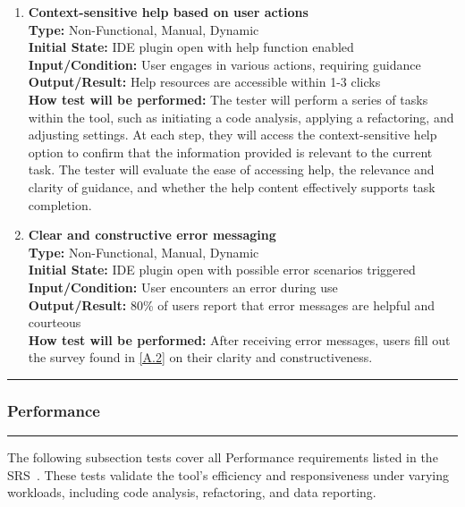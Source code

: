 \documentclass[12pt, titlepage]{article}
\newcommand{\colorrule}{\textcolor{BlueViolet}{\rule{\linewidth}{2pt}}}
\begin{document}
\begin{enumerate}[label={\bf \textcolor{Maroon}{test-UH-\arabic*}}, wide=0pt, font=\itshape]
  \item \textbf{Context-sensitive help based on user actions} \\[2mm]
    \textbf{Type:} Non-Functional, Manual, Dynamic \\
    \textbf{Initial State:} IDE plugin open with help function enabled \\
    \textbf{Input/Condition:} User engages in various actions, requiring guidance \\
    \textbf{Output/Result:} Help resources are accessible within 1-3 clicks \\[2mm]
    \textbf{How test will be performed:} The tester will perform a series of tasks within the tool, such as initiating a code analysis, applying a refactoring, and adjusting settings. At each step, they will access the context-sensitive help option to confirm that the information provided is relevant to the current task. The tester will evaluate the ease of accessing help, the relevance and clarity of guidance, and whether the help content effectively supports task completion.

  \item \textbf{Clear and constructive error messaging} \\[2mm]
    \textbf{Type:} Non-Functional, Manual, Dynamic \\
    \textbf{Initial State:} IDE plugin open with possible error scenarios triggered \\
    \textbf{Input/Condition:} User encounters an error during use \\
    \textbf{Output/Result:} 80\% of users report that error messages are helpful and courteous \\[2mm]
    \textbf{How test will be performed:} After receiving error messages, users fill out the survey found in \ref{A.2} on their clarity and constructiveness.
\end{enumerate}

\noindent
\textcolor{Blue}{\colorrule}

\subsubsection{Performance}
\colorrule

\medskip

\noindent
The following subsection tests cover all Performance requirements listed in the SRS~\cite{SRS}. These tests validate the tool’s efficiency and responsiveness under varying workloads, including code analysis, refactoring, and data reporting.
\end{document}
